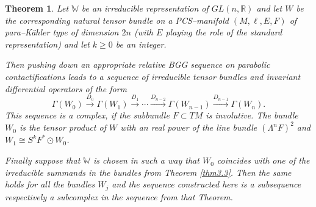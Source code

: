 \documentclass[12pt,a4paper]{amsart}
\def\Bbb{\mathbb}
\newcommand{\Ga}{\Gamma}
\newcommand{\La}{\Lambda}
\newcounter{theorem}
\numberwithin{theorem}{section}
\newtheorem{thm}[theorem]{Theorem}
\theoremstyle{definition}
\theoremstyle{remark}
\begin{document}
\begin{thm}\label{thm3.6}
  Let $\Bbb W$ be an irreducible representation of $GL(n,\Bbb R)$ and
  let $W$ be the corresponding natural tensor bundle on a
  PCS--manifold $(M,\ell,E,F)$ of para--K\"ahler type of dimension
  $2n$ (with $E$ playing the role of the standard representation) and
  let $k\geq 0$ be an integer.

  Then pushing down an appropriate relative BGG sequence on parabolic
  contactifications leads to a sequence of irreducible tensor bundles
  and invariant differential operators of the form
$$
\Ga(W_0)\overset{D_0}{\longrightarrow} \Ga(W_1)
\overset{D_1}{\longrightarrow} \cdots
\overset{D_{n-2}}{\longrightarrow} \Ga(W_{n-1})
\overset{D_{n-1}}{\longrightarrow} \Ga(W_n).
$$ 
This sequence is a complex, if the subbundle $F\subset TM$ is
involutive. The bundle $W_0$ is the tensor product of $W$ with an real
power of the line bundle $(\La^nF)^2$ and $W_1\cong S^k F^*\odot W_0$.

Finally suppose that $\Bbb W$ is chosen in such a way that $W_0$
coincides with one of the irreducible summands in the bundles from
Theorem \ref{thm3.3}. Then the same holds for all the bundles $W_j$ and
the sequence constructed here is a subsequence respectively a
subcomplex in the sequence from that Theorem.
\end{thm}
\end{document}
